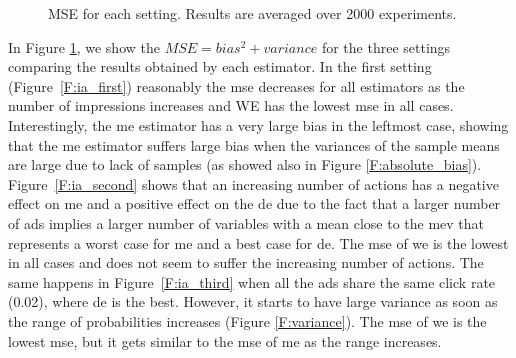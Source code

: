 \begin{figure}[t]
\begin{minipage}{\textwidth}
    \caption[Internet ads results]{MSE for each setting. Results are averaged over 2000 experiments.}\label{F:iAds}
    \end{minipage}
\end{figure}

In Figure \ref{F:iAds}, we show the $MSE = bias^2 + variance$ for the three settings comparing the results obtained by each estimator. 
In the first setting (Figure~\ref{F:ia_first}) reasonably the \gls{mse} decreases for all estimators as the number of impressions increases and WE has the lowest \gls{mse} in all cases. Interestingly, the \gls{me} estimator has a very large bias in the leftmost case, showing that the \gls{me} estimator suffers large bias when the variances of the sample means are large due to lack of samples (as showed also in Figure \ref{F:absolute_bias}).
Figure~\ref{F:ia_second} shows that an increasing number of actions has a negative effect on \gls{me} and a positive effect on the \gls{de} due to the fact that a larger number of ads implies a larger number of variables with a mean close to the \gls{mev} that represents a worst case for \gls{me} and a best case for \gls{de}. 
The \gls{mse} of \gls{we} is the lowest in all cases and does not seem to suffer the increasing number of actions. 
The same happens in Figure~\ref{F:ia_third} when all the ads share the same click rate (0.02), where \gls{de} is the best.
However, it starts to have large variance as soon as the range of probabilities increases (Figure \ref{F:variance}). 
The \gls{mse} of \gls{we} is the lowest \gls{mse}, but it gets similar to the \gls{mse} of \gls{me} as the range increases.

